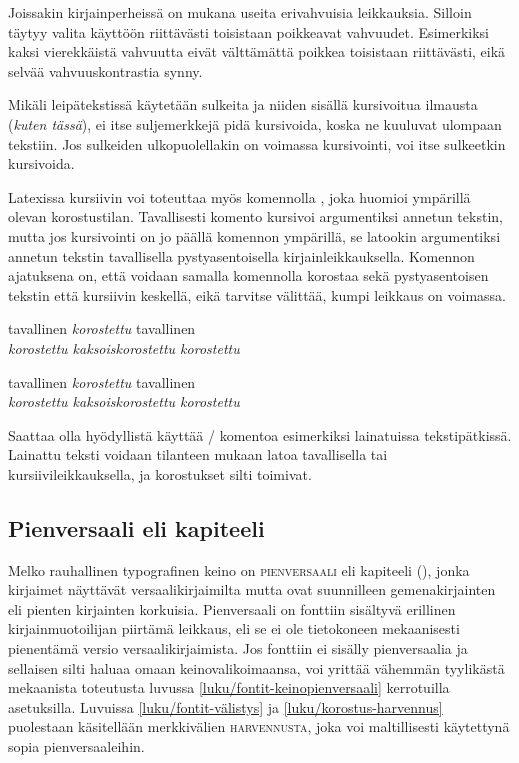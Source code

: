 Joissakin kirjainperheissä on mukana useita erivahvuisia leikkauksia.
Silloin täytyy valita käyttöön riittävästi toisistaan poikkeavat
vahvuudet. Esimerkiksi kaksi vierekkäistä vahvuutta eivät välttämättä
poikkea toisistaan riittävästi, eikä selvää vahvuuskontrastia synny.

Mikäli leipätekstissä käytetään sulkeita ja niiden sisällä kursivoitua
ilmausta (\textit{kuten tässä}), ei itse suljemerkkejä pidä kursivoida,
koska ne kuuluvat ulompaan tekstiin. Jos sulkeiden ulkopuolellakin on
voimassa kursivointi, voi itse sulkeetkin kursivoida.

Latexissa kursiivin voi toteuttaa myös komennolla , joka
huomioi ympärillä olevan korostustilan. Tavallisesti komento kursivoi
argumentiksi annetun tekstin, mutta jos kursivointi on jo päällä
komennon ympärillä, se latookin argumentiksi annetun tekstin
tavallisella pystyasentoisella kirjainleikkauksella. Komennon ajatuksena
on, että voidaan samalla komennolla korostaa sekä pystyasentoisen
tekstin että kursiivin keskellä, eikä tarvitse välittää, kumpi leikkaus
on voimassa.

\begin{koodilohkosis}
tavallinen \emph{korostettu} tavallinen \\
\emph{korostettu \emph{kaksoiskorostettu} korostettu}
\end{koodilohkosis}

\begin{tulossis}
  tavallinen \emph{korostettu} tavallinen \\
  \emph{korostettu \emph{kaksoiskorostettu} korostettu}
\end{tulossis}

Saattaa olla hyödyllistä käyttää \-/ komentoa esimerkiksi
lainatuissa tekstipätkissä. Lainattu teksti voidaan tilanteen mukaan
latoa tavallisella tai kursiivileikkauksella, ja korostukset silti
toimivat.

\subsection{Pienversaali eli kapiteeli}
\label{luku/korostus-pienversaali}

Melko rauhallinen typografinen keino on \textsc{pienversaali} eli
kapiteeli (), jonka kirjaimet näyttävät
versaalikirjaimilta mutta ovat suunnilleen gemenakirjainten eli pienten
kirjainten korkuisia. Pienversaali on fonttiin sisältyvä erillinen
kirjainmuotoilijan piirtämä leikkaus, eli se ei ole tietokoneen
mekaanisesti pienentämä versio versaalikirjaimista. Jos fonttiin ei
sisälly pienversaalia ja sellaisen silti haluaa omaan
keinovalikoimaansa, voi yrittää vähemmän tyylikästä mekaanista
toteutusta luvussa \ref{luku/fontit-keinopienversaali} kerrotuilla
asetuksilla. Luvuissa \ref{luku/fontit-välistys} ja
\ref{luku/korostus-harvennus} puolestaan käsitellään merkkivälien
{\scshape{} harvennusta}, joka voi
maltillisesti käytettynä sopia pienversaaleihin.

